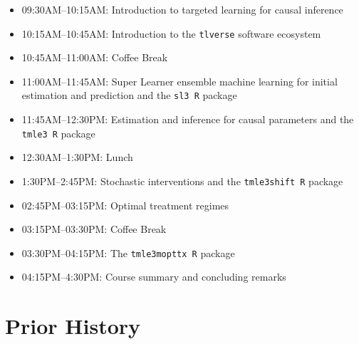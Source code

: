 \documentclass[a4paper,11pt]{texMemo}
\newcommand{\note}[2][]{\added[#1,remark={#2}]{}}
\begin{document}
\vspace{3in}

\note[id=RP]{Below I drafted an alternative schedule}

\begin{itemize}
  \itemsep0pt
  \item 09:30AM--10:15AM: Introduction to targeted learning for causal inference 
  \item 10:15AM--10:45AM: Introduction to the \texttt{tlverse} software ecosystem 
  \item 10:45AM--11:00AM: Coffee Break
  \item 11:00AM--11:45AM: Super Learner ensemble machine learning for initial estimation and prediction and the \texttt{sl3 R} package 
  \item 11:45AM--12:30PM: Estimation and inference for causal parameters and the \texttt{tmle3 R} package
  \item 12:30AM--1:30PM: Lunch
  \item 1:30PM--2:45PM: Stochastic interventions and the \texttt{tmle3shift R} package 
  \item 02:45PM--03:15PM: Optimal treatment regimes 
  \item 03:15PM--03:30PM: Coffee Break
  \item 03:30PM--04:15PM: The \texttt{tmle3mopttx R} package 
  \item 04:15PM--4:30PM: Course summary and concluding remarks
\end{itemize}


\section{Prior History}


\end{document}
